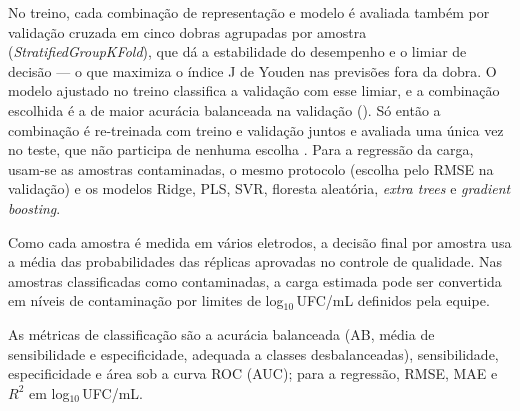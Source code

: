 No treino, cada combinação de representação e modelo é avaliada também por validação cruzada em
cinco dobras agrupadas por amostra (\textit{StratifiedGroupKFold}), que dá a estabilidade do
desempenho e o limiar de decisão --- o que maximiza o índice J de Youden \citep{youden1950} nas
previsões fora da dobra. O modelo ajustado no treino classifica a validação com esse limiar, e a
combinação escolhida é a de maior acurácia balanceada na validação (\CriterioEscolha). Só então a
combinação é re-treinada com treino e validação juntos e avaliada uma única vez no teste, que não
participa de nenhuma escolha \citep{raschka2018,vabalas2019}. Para a regressão da carga, usam-se as
amostras contaminadas, o mesmo protocolo (escolha pelo RMSE na validação) e os modelos Ridge, PLS,
SVR, floresta aleatória, \textit{extra trees} e \textit{gradient boosting}.

Como cada amostra é medida em vários eletrodos, a decisão final por amostra usa a média das
probabilidades das réplicas aprovadas no controle de qualidade. Nas amostras classificadas como
contaminadas, a carga estimada pode ser convertida em níveis de contaminação por limites de
log$_{10}$\,UFC/mL definidos pela equipe. 

As métricas de classificação são a acurácia balanceada (AB, média de sensibilidade e
especificidade, adequada a classes desbalanceadas), sensibilidade, especificidade e área sob a
curva ROC (AUC); para a regressão, RMSE, MAE e $R^2$ em log$_{10}$\,UFC/mL.
